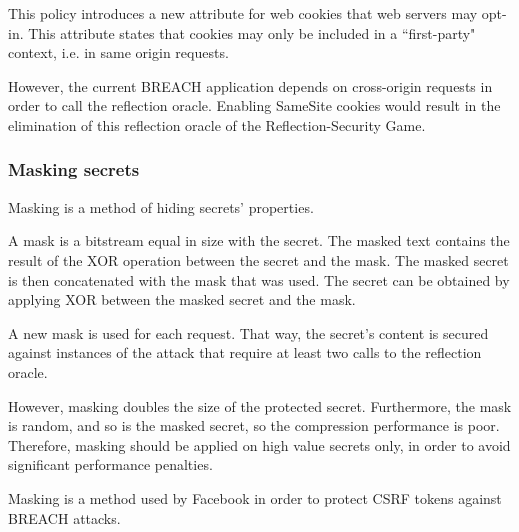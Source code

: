 This policy introduces a new attribute for web cookies that web servers may
opt-in. This attribute states that cookies may only be included in a
``first-party" context, i.e. in same origin requests.

However, the current BREACH application depends on cross-origin requests in
order to call the reflection oracle. Enabling SameSite cookies would result in
the elimination of this reflection oracle of the Reflection-Security Game.

\subsubsection{Masking secrets}\label{subsec:masking}
Masking is a method of hiding secrets' properties.

A mask is a bitstream equal in size with the secret. The masked text contains
the result of the XOR operation between the secret and the mask. The masked
secret is then concatenated with the mask that was used. The secret can be
obtained by applying XOR between the masked secret and the mask.

A new mask is used for each request. That way, the secret's content is secured
against instances of the attack that require at least two calls to the
reflection oracle.

However, masking doubles the size of the protected secret. Furthermore, the mask
is random, and so is the masked secret, so the compression performance is poor.
Therefore, masking should be applied on high value secrets only, in order to
avoid significant performance penalties.

Masking is a method used by Facebook \cite{facebookbreach} in order to protect CSRF tokens
against BREACH attacks.
